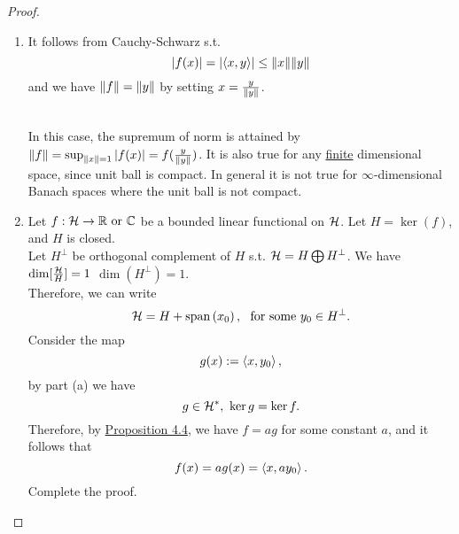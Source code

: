 \begin{proof}\
\begin{enumerate}[label = (\alph*)]
    \item It follows from Cauchy-Schwarz s.t.
    \begin{equation*}
        \abs{f(x)} = \abs{\left\langle x, y \right\rangle} \leq \norm{x} \norm{y} 
    \end{equation*}
    and we have $\norm{f} = \norm{y}$ by setting $x = \frac{y}{\norm{y}}$. 
    \begin{remark}\ \\
    In this case, the supremum of norm is attained by $\norm{f} = \sup_{\norm{x} = 1} \abs{f(x)} = f(\frac{y}{\norm{y}})$. It is also true for any \underline{finite} dimensional space, since unit ball is compact. In general it is not true for $\infty$-dimensional Banach spaces where the unit ball is not compact.
    \end{remark}
    \item Let $f: \mathcal{H} \to \mathbb{R} \text{ or } \mathbb{C}$ be a bounded linear functional on $\mathcal{H}$. Let $H = \ker(f)$, and $H$ is closed.\\ Let $H^\perp$ be orthogonal complement of $H$ s.t. $\mathcal{H} = H \bigoplus H^\perp$. We have $\dim[\frac{\mathcal{H}}{H}] = 1$ \imply $\dim(H^\perp) = 1$.\\
    Therefore, we can write
    \begin{equation*}
        \mathcal{H} = H + \operatorname{span}\left(x_0\right),\ \text{ for some } y_0 \in H^\perp.
    \end{equation*}
    Consider the map
    \begin{equation*}
        g(x) := \left\langle x, y_0 \right\rangle,
    \end{equation*}
    by part (a) we have
    \begin{equation*}
        g \in \mathcal{H}^*,\ \ker{g} = \ker{f}.
    \end{equation*}
    Therefore, by \hyperref[4.4]{Proposition 4.4}, we have $f = ag$ for some constant $a$, and it follows that
    \begin{equation*}
        f(x) = ag(x) = \left\langle x, a y_0 \right\rangle.
    \end{equation*}
    Complete the proof.
\end{enumerate}
\end{proof}


